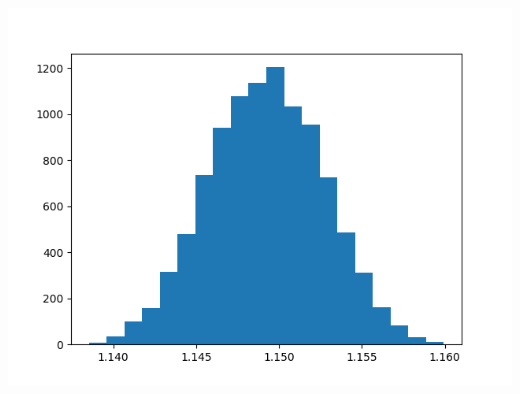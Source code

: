 \begin{Answer}
\begin{center}
\includegraphics[scale=0.3]{TP/Images/TP17_histo6.png}
\end{center}
\newpage
\end{Answer}
